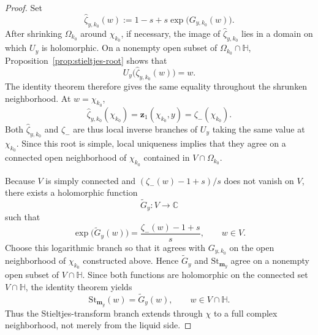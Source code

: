 \documentclass[10pt,a4paper]{amsart}
\begin{document}
\begin{proof}
Set
\[
    \widehat\zeta_{y,k_0}(w)
    :=
    1-s+s\exp\bigl(G_{y,k_0}(w)\bigr).
\]
After shrinking \(\Omega_{k_0}\) around \(\chi_{k_0}\), if necessary, the
image of \(\widehat\zeta_{y,k_0}\) lies in a domain on which \(U_y\) is
holomorphic. On a nonempty open subset of
\(\Omega_{k_0}\cap\mathbb H\), Proposition~\ref{prop:stieltjes-root}
shows that
\[
    U_y\bigl(\widehat\zeta_{y,k_0}(w)\bigr)=w.
\]
The identity theorem therefore gives the same equality throughout the
shrunken neighborhood. At \(w=\chi_{k_0}\),
\[
    \widehat\zeta_{y,k_0}(\chi_{k_0})
    =\mathbf z_1(\chi_{k_0},y)
    =\zeta_-(\chi_{k_0}).
\]
Both \(\widehat\zeta_{y,k_0}\) and \(\zeta_-\) are thus local inverse
branches of \(U_y\) taking the same value at \(\chi_{k_0}\). Since this root
is simple, local uniqueness implies that they agree on a connected open
neighborhood of \(\chi_{k_0}\) contained in
\(V\cap\Omega_{k_0}\).

Because \(V\) is simply connected and
\((\zeta_-(w)-1+s)/s\) does not vanish on \(V\), there exists a holomorphic
function
\[
    \widetilde G_y:V\longrightarrow\mathbb C
\]
such that
\[
    \exp\bigl(\widetilde G_y(w)\bigr)
    =
    \frac{\zeta_-(w)-1+s}{s},
    \qquad w\in V.
\]
Choose this logarithmic branch so that it agrees with \(G_{y,k_0}\) on the
open neighborhood of \(\chi_{k_0}\) constructed above. Hence
\(\widetilde G_y\) and \(\mathrm{St}_{\mathbf m_y}\) agree on a nonempty
open subset of \(V\cap\mathbb H\). Since both functions are holomorphic on
the connected set \(V\cap\mathbb H\), the identity theorem yields
\[
    \mathrm{St}_{\mathbf m_y}(w)=\widetilde G_y(w),
    \qquad w\in V\cap\mathbb H.
\]
Thus the Stieltjes-transform branch extends through \(\chi\) to a full
complex neighborhood, not merely from the liquid side.


\end{proof}
\end{document}
